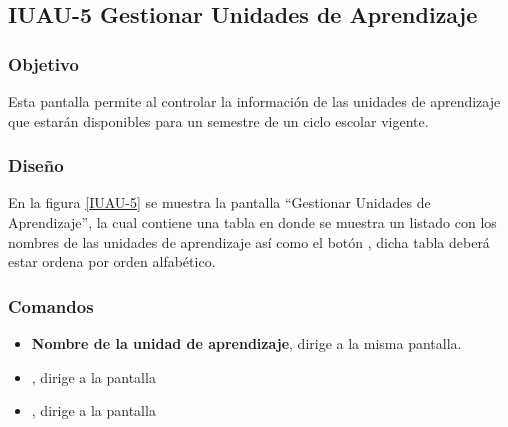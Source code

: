 \subsection{IUAU-5 Gestionar Unidades de Aprendizaje}

\subsubsection{Objetivo}

	
    Esta pantalla permite al  controlar la información de las unidades de aprendizaje que estarán disponibles para un semestre de un ciclo escolar vigente.
\subsubsection{Diseño}


    En la figura \ref{IUAU-5} se muestra la pantalla ``Gestionar Unidades de Aprendizaje'', la cual contiene una tabla en donde se muestra un listado con los nombres de las unidades de aprendizaje así como el botón , dicha tabla deberá estar ordena por orden alfabético. 



\subsubsection{Comandos}
    \begin{itemize}

	\item \textbf{Nombre de la unidad de aprendizaje}, dirige a la misma pantalla.
	\item {}, dirige a la pantalla 
	\item {}, dirige a la pantalla 
    \end{itemize}
